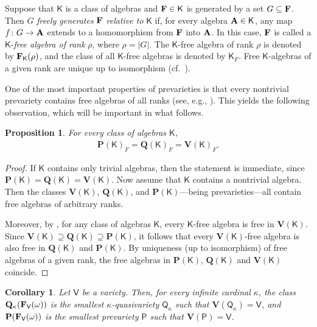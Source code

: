 \documentclass[submission,copyright,creativecommons]{eptcs}
\newtheorem{cor}[theorem]{Corollary}
\newtheorem{prop}[theorem]{Proposition}
\theoremstyle{definition}
\newcommand{\alg}[1]{{{\textbf{\upshape #1}}}}
\newcommand{\VV}{\mathbf{V}}
\newcommand{\QQ}{\mathbf{Q}}
\newcommand{\PR}{\mathbf{P}}
\newcommand{\vv}[1]{\mathsf {#1}}
\newcommand{\FrV}{\alg F_\vv V(\omega)}
\newcommand{\Def}[1]{\textit{#1}}
\newcommand{\kk}{\kappa}
\begin{document}
Suppose that $\vv K$ is a class of algebras and $\alg F \in \vv K$ is generated by a set $G \subseteq \alg F$. Then $G$ \Def{freely generates} $\alg F$ \Def{relative to} $\vv K$ if, for every algebra $\alg A \in \vv K$, any map $f \colon G \to \alg A$ extends to a homomorphism from $\alg F$ into $\alg A$. In this case, $\alg F$ is called a $\vv K$-\Def{free algebra of rank} $\rho$, where $\rho = |G|$. The $\vv K$-free algebra of rank $\rho$ is denoted by $\alg F_\vv K(\rho)$, and the class of all $\vv K$-free algebras is denoted by $\vv K_F$. Free $\vv K$-algebras of a given rank are unique up to isomorphism (cf.\ \cite[Theorem~10.7]{BurrisSanka}).

One of the most important properties of prevarieties is that every nontrivial prevariety contains free algebras of all ranks (see, e.g., \cite[Theorem~10.12]{BurrisSanka}). This yields the following observation, which will be important in what follows.

\begin{prop}\label{pr-free}
	For every class of algebras $\vv K$,
	\begin{align*}
		\PR(\vv K)_F = \QQ(\vv K)_F = \VV(\vv K)_F.
	\end{align*}
\end{prop}

\begin{proof}
	If $\vv K$ contains only trivial algebras, then the statement is immediate, since $\PR(\vv K) = \QQ(\vv K) = \VV(\vv K)$. Now assume that $\vv K$ contains a nontrivial algebra. Then the classes $\VV(\vv K)$, $\QQ(\vv K)$, and $\PR(\vv K)$—being prevarieties—all contain free algebras of arbitrary ranks.

	Moreover, by \cite[Corollary~2.1.13]{GorbunovBookE}, for any class of algebras $\vv K$, every $\vv K$-free algebra is free in $\VV(\vv K)$. Since $\VV(\vv K) \supseteq \QQ(\vv K) \supseteq \PR(\vv K)$, it follows that every $\VV(\vv K)$-free algebra is also free in $\QQ(\vv K)$ and $\PR(\vv K)$. By uniqueness (up to isomorphism) of free algebras of a given rank, the free algebras in $\PR(\vv K)$, $\QQ(\vv K)$ and $\VV(\vv K)$ coincide. 
\end{proof}


\begin{cor}\label{cor-free}
	Let $\vv V$ be a variety. Then, for every infinite cardinal $\kk$, the class $\QQ_\kk(\FrV)$ is the smallest $\kk$-quasivariety $\vv Q_\kk$ such that $\VV(\vv Q_\kk)=\vv V$, and $\PR(\FrV)$ is the smallest prevariety $\vv P$ such that $\VV(\vv P) = \vv V$.
\end{cor}
\end{document}
